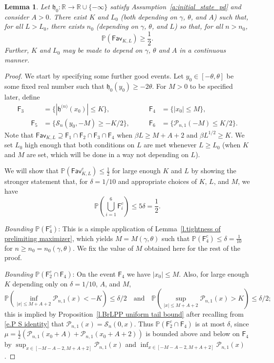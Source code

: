 \documentclass[oneside,final,11pt]{amsart}
\newtheorem{lemma}[thm]{Lemma}
\theoremstyle{definition}
\newcommand{\fav}{\mathsf{Fav}}
\renewcommand{\L}{\CP}
\newcommand{\fh}{\mathfrak{h}}
\newcommand{\h}{\fh^{{\scriptscriptstyle(}n{\scriptscriptstyle)}}}
\newcommand{\R}{\mathbb{R}}
\newcommand{\CS}{\mathcal{S}}
\renewcommand{\S}{\CS}
\newcommand{\1}[1]{\mathbf{1}_{#1}}
\newcommand{\hlim}{\mathfrak{h}}
\newcommand{\msf}{\mathsf}
\newcommand{\CP}{\mathcal{P}}
\renewcommand{\P}{\mathbb P}
\numberwithin{equation}{section}
\begin{document}
\begin{lemma}\label{l.fav probability}
Let $\hlim_0:\R\to\R\cup\{-\infty\}$ satisfy Assumption~\ref{a:initial_state_pd} and consider $A>0$. There exist $K$ and $L_0$ (both depending on $\gamma$, $\theta$, and $A$) such that, for all $L>L_0$, there exists $n_0$ (depending on $\gamma$, $\theta$, and $L$) so that, for all $n>n_0$,
%
$$\P(\fav_{K,L}) \geq \frac{1}{2}.$$
%
Further, $K$ and $L_0$ may be made to depend on $\gamma$, $\theta$ and $A$ in a continuous manner.
\end{lemma}

\begin{proof}
We start by specifying some further good events. Let $y_0\in[-\theta,\theta]$ be some fixed real number such that  $\hlim_0(y_0) \geq -2\theta$. For $M>0$ to be specified later, define
%
\begin{align*}
\msf F_3 &= \bigl\{|\h(x_0)| \leq K\bigr\}, \qquad &\msf F_4 &= \big\{|x_0| \leq M\big\},\\ \qquad %
%
\msf F_5 &= \Big\{\S_n(y_0, -M) \geq -K/2\Big\}, \qquad &\msf F_6 &= \Big\{\L_{n,1}(-M) \leq K/2\Big\}.
\end{align*}
%
Note that $\fav_{K, L}\supseteq \msf F_1\cap\msf F_2\cap\msf F_3\cap \msf F_4$ when $\beta L\geq M+A+2$ and $\beta L^{1/2}\geq K$. We set $L_0$ high enough that both conditions on $L$ are met whenever $L\geq L_0$ (when $K$ and $M$ are set, which will be done in a way not depending on $L$).

We will show that $\P\left(\fav_{K, L}^c\right) \leq \tfrac{1}{2}$ for large enough $K$ and $L$ by showing the stronger statement that, for $\delta=1/10$ and appropriate choices of $K$, $L$, and $M$, we have
%
$$\P\left(\bigcup_{i=1}^6 \msf F_i^c\right) \leq 5\delta = \frac{1}{2}.$$
%

\noindent\emph{Bounding $\P(\msf F_4^c)$}: This is a simple application of Lemma~\ref{l.tightness of prelimiting maximizer}, which yields $M = M(\gamma,\theta)$ such that $\P(\msf F_4^c) \leq \delta = \frac{1}{10}$ for $n\geq n_0 = n_0(\gamma,\theta)$. We fix the value of $M$ obtained here for the rest of the proof.
\medskip


\noindent\emph{Bounding $\P(\msf F_2^c\cap \msf F_4)$}: On the event $\msf F_4$ we have $|x_0|\leq M$. Also, for large enough $K$ depending only on $\delta=1/10$, $A$, and $M$,
%
$$\P\left(\inf_{|x|\leq M+A+2} \L_{n,1}(x) < -K\right) \leq \delta/2 \quad\text{and}\quad \P\left(\sup_{|x| \leq M+A+2} \L_{n,1}(x) > K\right) \leq \delta/2;$$
%
this is implied by Proposition~\ref{l.BrLPP uniform tail bound} after recalling from \eqref{e.P S identity} that $\L_{n,1}(x) = \S_n(0, x)$.
Thus $\P(\msf F_2^c\cap \msf F_4)$ is at most $\delta$, since $\mu = \frac{1}{2}(\L_{n,1}(x_0+ A) + \L_{n,1}(x_0+A+2))$ is bounded above and below on $\msf F_4$ by $\sup_{x\in[-M-A-2, M+A+2]} \L_{n,1}(x)$ and $\inf_{x\in[-M-A-2, M+A+2]} \L_{n,1}(x)$.
\medskip


\end{proof}
\end{document}
